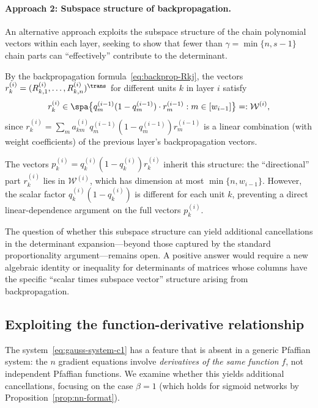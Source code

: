 \paragraph{Approach 2: Subspace structure of backpropagation.}
An alternative approach exploits the subspace structure of the chain polynomial vectors within each layer, seeking to show that fewer than $\gamma = \min\{n, s-1\}$ chain parts can ``effectively'' contribute to the determinant.

By the backpropagation formula~\eqref{eq:backprop-Rkj}, the vectors $r_k^{(i)} = (R_{k,1}^{(i)}, \ldots, R_{k,n}^{(i)})^\trans$ for different units $k$ in layer $i$ satisfy
\begin{equation}\label{eq:backprop-subspace}
  r_k^{(i)} \in \spa\bigl\{q_m^{(i-1)}(1-q_m^{(i-1)}) \cdot r_m^{(i-1)} : m \in [w_{i-1}]\bigr\} =: \mathcal{W}^{(i)},
\end{equation}
since $r_k^{(i)} = \sum_m a_{km}^{(i)} q_m^{(i-1)}(1-q_m^{(i-1)}) r_m^{(i-1)}$ is a linear combination (with weight coefficients) of the previous layer's backpropagation vectors.

The vectors $p_k^{(i)} = q_k^{(i)}(1-q_k^{(i)}) r_k^{(i)}$ inherit this structure: the ``directional'' part $r_k^{(i)}$ lies in $\mathcal{W}^{(i)}$, which has dimension at most $\min\{n, w_{i-1}\}$. However, the scalar factor $q_k^{(i)}(1-q_k^{(i)})$ is different for each unit $k$, preventing a direct linear-dependence argument on the full vectors $p_k^{(i)}$.

The question of whether this subspace structure can yield additional cancellations in the determinant expansion---beyond those captured by the standard proportionality argument---remains open. A positive answer would require a new algebraic identity or inequality for determinants of matrices whose columns have the specific ``scalar times subspace vector'' structure arising from backpropagation.

\subsection{Exploiting the function-derivative relationship}\label{subsec:func-deriv}

The system~\eqref{eq:gauss-system-c1} has a feature that is absent in a generic Pfaffian system: the $n$ gradient equations involve \emph{derivatives of the same function} $f$, not independent Pfaffian functions. We examine whether this yields additional cancellations, focusing on the case $\beta = 1$ (which holds for sigmoid networks by Proposition~\ref{prop:nn-format}).

